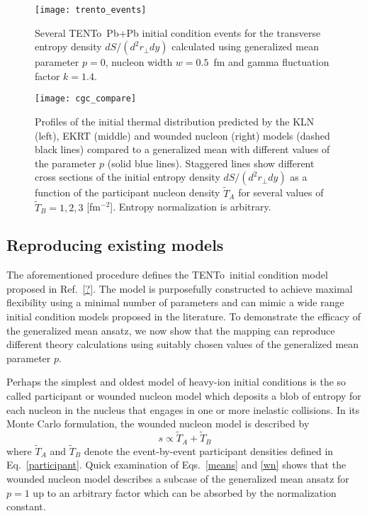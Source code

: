 \documentclass[aps,prc,reprint,amsmath,nofootinbib]{revtex4-1}
\newcommand{\trento}{T\raisebox{-0.5ex}{R}ENTo}
\newcommand{\T}{\tilde{T}}
\begin{document}
\begin{figure}
    \texttt{[image: trento\_events]}
    \caption{Several \protect\trento\ Pb+Pb initial condition events for the transverse entropy density $dS/(d^2r_\perp dy)$ calculated using generalized mean parameter $p=0$, nucleon width $w=0.5$~fm and gamma fluctuation factor $k=1.4$.}
    \label{fig:trento_events}
\end{figure}

\begin{figure*}
    \texttt{[image: cgc\_compare]}
    \caption{Profiles of the initial thermal distribution predicted by the KLN (left), EKRT (middle) and wounded nucleon (right) models (dashed black lines) compared to a generalized mean with different values of the parameter $p$ (solid blue lines).
    Staggered lines show different cross sections of the initial entropy density $dS/(d^2r_\perp dy)$ as a function of the participant nucleon density $\T_A$ for several values of $\T_B = 1, 2, 3$ [fm$^{-2}$]. Entropy normalization is arbitrary.}
    \label{fig:cgc_compare}
\end{figure*}


\subsection{Reproducing existing models}

The aforementioned procedure defines the \trento\ initial condition model proposed in Ref.~\ref{?}. The model is purposefully constructed to achieve maximal flexibility using a minimal number of parameters and can mimic a wide range initial condition models proposed in the literature. To demonstrate the efficacy of the generalized mean ansatz, we now show that the mapping can reproduce different theory calculations using suitably chosen values of the generalized mean parameter $p$.

Perhaps the simplest and oldest model of heavy-ion initial conditions is the so called participant or wounded nucleon model which deposits a blob of entropy for each nucleon in the nucleus that engages in one or more inelastic collisions. In its Monte Carlo formulation, the wounded nucleon model is described by
\begin{equation}
    \label{wn}
    s \propto \T_A + \T_B
\end{equation}
where $\T_A$ and $\T_B$ denote the event-by-event participant densities defined in Eq.~\eqref{participant}. Quick examination of Eqs.~\eqref{means} and \eqref{wn} shows that the wounded nucleon model describes a subcase of the generalized mean ansatz for $p=1$ up to an arbitrary factor which can be absorbed by the normalization constant.
\end{document}
